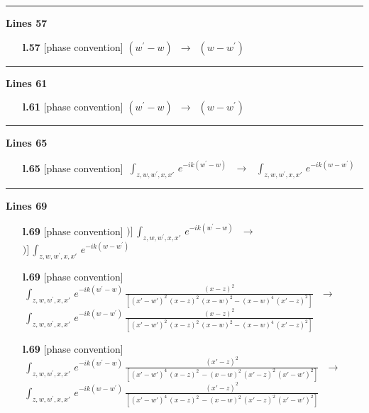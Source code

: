 \documentclass[10pt]{article}
\begin{document}
\noindent\rule{\linewidth}{0.3pt}\par\noindent\textbf{Lines 57} \par
\begin{itemize}[leftmargin=2.2em,itemsep=1pt,topsep=2pt]
\item[\textbf{l.57}] \textsf{\small [phase convention]} $\displaystyle (w^{\prime}-w)$\ $\longrightarrow$\ $\displaystyle (w-w^{\prime})$
\end{itemize}
\noindent\rule{\linewidth}{0.3pt}\par\noindent\textbf{Lines 61} \par
\begin{itemize}[leftmargin=2.2em,itemsep=1pt,topsep=2pt]
\item[\textbf{l.61}] \textsf{\small [phase convention]} $\displaystyle (w^{\prime}-w)$\ $\longrightarrow$\ $\displaystyle (w-w^{\prime})$
\end{itemize}
\noindent\rule{\linewidth}{0.3pt}\par\noindent\textbf{Lines 65} \par
\begin{itemize}[leftmargin=2.2em,itemsep=1pt,topsep=2pt]
\item[\textbf{l.65}] \textsf{\small [phase convention]} $\displaystyle \,\int_{z,w,w^{\prime},x,x'}\, e^{-ik(w^{\prime}-w)}\,$\ $\longrightarrow$\ $\displaystyle \,\int_{z,w,w^{\prime},x,x'}\, e^{-ik(w-w^{\prime})}\,$
\end{itemize}
\noindent\rule{\linewidth}{0.3pt}\par\noindent\textbf{Lines 69} \par
\begin{itemize}[leftmargin=2.2em,itemsep=1pt,topsep=2pt]
\item[\textbf{l.69}] \textsf{\small [phase convention]} $\displaystyle )\Big]\,\int_{z,w,w^{\prime},x,x'}\, e^{-ik(w^{\prime}-w)}\,$\ $\longrightarrow$\ $\displaystyle )\Big]\,\int_{z,w,w^{\prime},x,x'}\, e^{-ik(w-w^{\prime})}\,$
\item[\textbf{l.69}] \textsf{\small [phase convention]} $\displaystyle \,\int_{z,w,w^{\prime},x,x'}\, e^{-ik(w^{\prime}-w)}\, \frac{(x-z)^{2}}{[(x'-w')^{2}\,(x-z)^{2}\,(x-w)^{2} - (x-w)^{4}\, (x'-z)^{2}]}\,$\ $\longrightarrow$\ $\displaystyle \,\int_{z,w,w^{\prime},x,x'}\, e^{-ik(w-w^{\prime})}\, \frac{(x-z)^{2}}{[(x'-w')^{2}\,(x-z)^{2}\,(x-w)^{2} - (x-w)^{4}\, (x'-z)^{2}]}\,$
\item[\textbf{l.69}] \textsf{\small [phase convention]} $\displaystyle \,\int_{z,w,w^{\prime},x,x'}\, e^{-ik(w^{\prime}-w)}\, \frac{(x'-z)^{2}}{[(x'-w')^{4}\,(x-z)^{2}\, - (x-w)^{2}\, (x'-z)^{2}\,(x'-w')^{2}]}\,$\ $\longrightarrow$\ $\displaystyle \,\int_{z,w,w^{\prime},x,x'}\, e^{-ik(w-w^{\prime})}\, \frac{(x'-z)^{2}}{[(x'-w')^{4}\,(x-z)^{2}\, - (x-w)^{2}\, (x'-z)^{2}\,(x'-w')^{2}]}\,$
\end{itemize}
\end{document}

